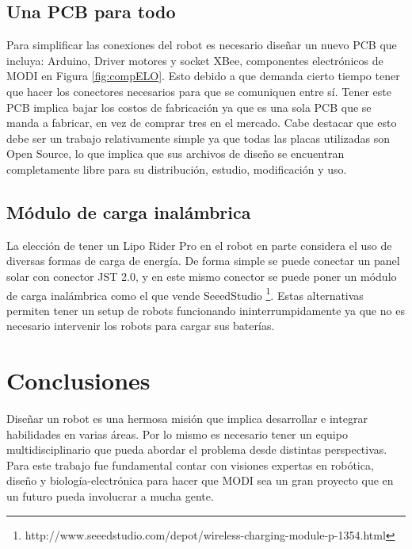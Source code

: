 
\subsection{Una PCB para todo}

Para simplificar las conexiones del robot es necesario diseñar un nuevo PCB que incluya: Arduino, Driver motores y socket XBee, componentes electrónicos de MODI en Figura \ref{fig:compELO}. Esto debido a que demanda cierto tiempo tener que hacer los conectores necesarios para que se comuniquen entre sí. Tener este PCB implica bajar los costos de fabricación ya que es una sola PCB que se manda a fabricar, en vez de comprar tres en el mercado. Cabe destacar que esto debe ser un trabajo relativamente simple ya que todas las placas utilizadas son Open Source, lo que implica que sus archivos de diseño se encuentran completamente libre para su distribución, estudio, modificación y uso.



\subsection{Módulo de carga inalámbrica}
La elección de tener un Lipo Rider Pro en el robot en parte considera el uso de diversas formas de carga de energía. De forma simple se puede conectar un panel solar con conector JST 2.0, y en este mismo conector se puede poner un módulo de carga inalámbrica como el que vende SeeedStudio \footnote{http://www.seeedstudio.com/depot/wireless-charging-module-p-1354.html}. Estas alternativas permiten tener un setup de robots funcionando ininterrumpidamente ya que no es necesario intervenir los robots para cargar sus baterías. 



\section{Conclusiones}
Diseñar un robot es una hermosa misión que implica desarrollar e integrar habilidades en varias áreas. Por lo mismo es necesario tener un equipo multidisciplinario que pueda abordar el problema desde distintas perspectivas. Para este trabajo fue fundamental contar con visiones expertas en robótica, diseño y biología-electrónica para hacer que MODI sea un gran proyecto que en un futuro pueda involucrar a mucha gente.

